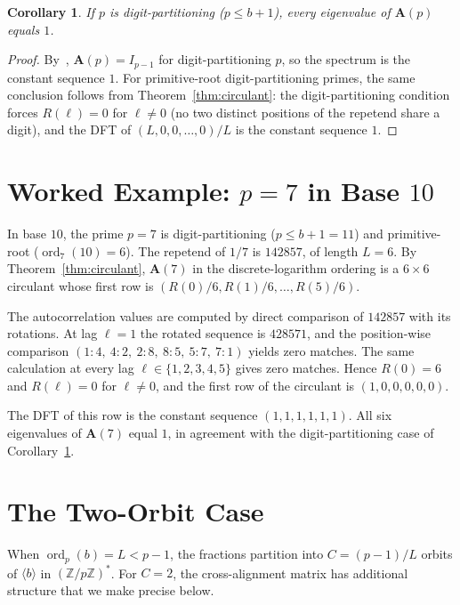 \documentclass[12pt]{amsart}
\newtheorem{corollary}[theorem]{Corollary}
\theoremstyle{definition}
\theoremstyle{remark}
\begin{document}
\begin{corollary}\label{cor:dp-flat}
If $p$ is digit-partitioning ($p \le b{+}1$), every eigenvalue
of $\mathbf{A}(p)$ equals $1$.
\end{corollary}

\begin{proof}
By~\cite{paper6}, $\mathbf{A}(p) = I_{p-1}$ for digit-partitioning
$p$, so the spectrum is the constant sequence $1$. For
primitive-root digit-partitioning primes, the same conclusion
follows from Theorem~\ref{thm:circulant}: the digit-partitioning
condition forces $R(\ell) = 0$ for $\ell \ne 0$ (no two distinct
positions of the repetend share a digit), and the DFT of
$(L, 0, 0, \ldots, 0)/L$ is the constant sequence $1$.
\end{proof}

\section{Worked Example: $p = 7$ in Base $10$}\label{sec:p7}

In base $10$, the prime $p = 7$ is digit-partitioning
($p \le b{+}1 = 11$) and primitive-root
($\operatorname{ord}_7(10) = 6$). The repetend of $1/7$ is
$142857$, of length $L = 6$. By Theorem~\ref{thm:circulant},
$\mathbf{A}(7)$ in the discrete-logarithm ordering is a
$6 \times 6$ circulant whose first row is
$(R(0)/6, R(1)/6, \ldots, R(5)/6)$.

The autocorrelation values are computed by direct comparison
of $142857$ with its rotations. At lag $\ell = 1$ the rotated
sequence is $428571$, and the position-wise comparison
$(1{:}4,\ 4{:}2,\ 2{:}8,\ 8{:}5,\ 5{:}7,\ 7{:}1)$ yields zero
matches. The same calculation at every lag $\ell \in
\{1, 2, 3, 4, 5\}$ gives zero matches. Hence
$R(0) = 6$ and $R(\ell) = 0$ for $\ell \ne 0$, and the first
row of the circulant is $(1, 0, 0, 0, 0, 0)$.

The DFT of this row is the constant sequence
$(1, 1, 1, 1, 1, 1)$. All six eigenvalues of $\mathbf{A}(7)$
equal $1$, in agreement with the digit-partitioning case
of Corollary~\ref{cor:dp-flat}.

\section{The Two-Orbit Case}

When $\operatorname{ord}_p(b) = L < p{-}1$, the fractions
partition into $C = (p{-}1)/L$ orbits of $\langle b \rangle$
in $(\mathbb{Z}/p\mathbb{Z})^*$. For $C = 2$, the
cross-alignment matrix has additional structure that we
make precise below.
\end{document}
